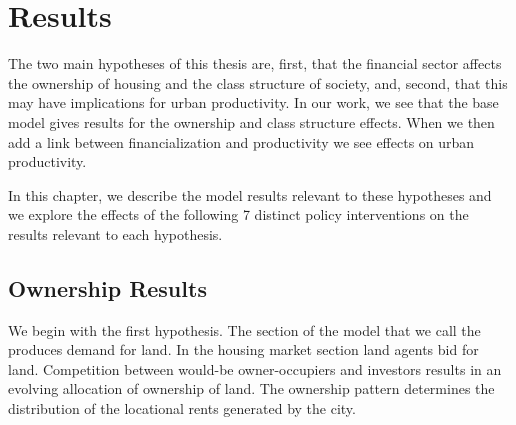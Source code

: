\chapter{Results} \label{chapter-results}

The two main hypotheses of this thesis are, first, that the financial sector affects the ownership of housing and the class structure of society, and, second, that this may have implications for urban productivity.  In our work, we see that the base model gives results for the ownership and class structure effects. When we then add a link between financialization and productivity we see effects on urban productivity. 


In this chapter, we describe the model results relevant to these hypotheses and we explore the effects of the following 7 distinct policy interventions on the results relevant to each hypothesis.

\begin{enumerate}
\end{enumerate}


\section{Ownership Results}
We begin with the first hypothesis. The section of the model that we call the produces demand for land. In the housing market section land agents bid for land. Competition between would-be owner-occupiers and investors results in an evolving allocation of ownership of land. The ownership pattern determines the distribution of the locational rents generated by the city.





